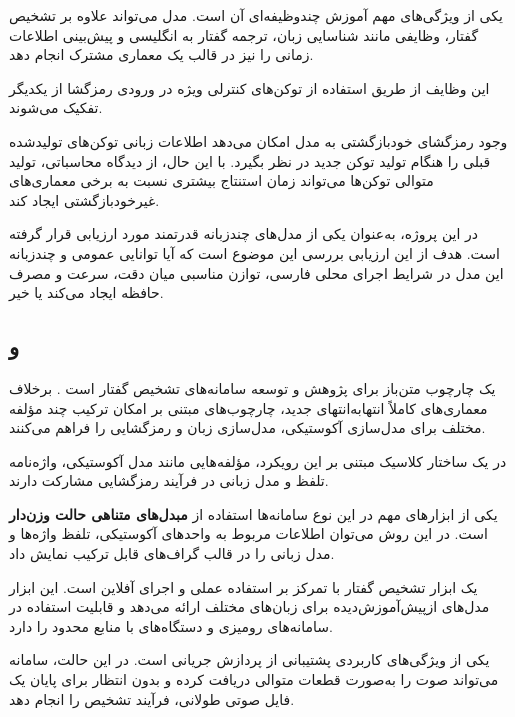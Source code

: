 یکی از ویژگی‌های مهم  آموزش چندوظیفه‌ای آن است.
مدل می‌تواند علاوه بر تشخیص گفتار، وظایفی مانند شناسایی زبان،
ترجمه گفتار به انگلیسی و پیش‌بینی اطلاعات زمانی را نیز
در قالب یک معماری مشترک انجام دهد.

این وظایف از طریق استفاده از توکن‌های کنترلی ویژه در ورودی
رمزگشا از یکدیگر تفکیک می‌شوند.

وجود رمزگشای خودبازگشتی به مدل امکان می‌دهد اطلاعات زبانی
توکن‌های تولیدشده قبلی را هنگام تولید توکن جدید در نظر بگیرد.
با این حال، از دیدگاه محاسباتی، تولید متوالی توکن‌ها می‌تواند
زمان استنتاج بیشتری نسبت به برخی معماری‌های غیرخودبازگشتی
ایجاد کند.

در این پروژه،
به‌عنوان یکی از مدل‌های چندزبانه قدرتمند مورد ارزیابی قرار
گرفته است.
هدف از این ارزیابی بررسی این موضوع است که آیا توانایی عمومی
و چندزبانه این مدل در شرایط اجرای محلی فارسی، توازن مناسبی
میان دقت، سرعت و مصرف حافظه ایجاد می‌کند یا خیر.


\subsection{ و }

یک چارچوب متن‌باز برای پژوهش و توسعه سامانه‌های تشخیص گفتار
است \cite{povey2011kaldi}.
برخلاف معماری‌های کاملاً انتهابه‌انتهای جدید، چارچوب‌های
مبتنی بر  امکان ترکیب چند مؤلفه مختلف برای
مدل‌سازی آکوستیکی، مدل‌سازی زبان و رمزگشایی را فراهم می‌کنند.

در یک ساختار کلاسیک مبتنی بر این رویکرد، مؤلفه‌هایی مانند
مدل آکوستیکی، واژه‌نامه تلفظ
و مدل زبانی در فرآیند رمزگشایی مشارکت دارند.

یکی از ابزارهای مهم در این نوع سامانه‌ها استفاده از
\textbf{مبدل‌های متناهی حالت وزن‌دار}
است.
در این روش می‌توان اطلاعات مربوط به واحدهای آکوستیکی،
تلفظ واژه‌ها و مدل زبانی را در قالب گراف‌های قابل ترکیب
نمایش داد.

یک ابزار تشخیص گفتار با تمرکز بر استفاده عملی و اجرای
آفلاین است.
این ابزار مدل‌های ازپیش‌آموزش‌دیده برای زبان‌های مختلف ارائه
می‌دهد و قابلیت استفاده در سامانه‌های رومیزی و دستگاه‌های با
منابع محدود را دارد.

یکی از ویژگی‌های کاربردی  پشتیبانی از پردازش
جریانی
است.
در این حالت، سامانه می‌تواند صوت را به‌صورت قطعات متوالی
دریافت کرده و بدون انتظار برای پایان یک فایل صوتی طولانی،
فرآیند تشخیص را انجام دهد.

